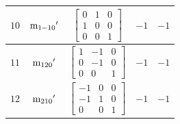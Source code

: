\documentclass[fleqn,8pt]{jsarticle}
\begin{document}
\begin{longtable}{ccccc}
$ 10 $ & $ {\rm m}_{1-10}{}' $ & $ \begin{bmatrix} 0 & 1 & 0 \\ 1 & 0 & 0 \\ 0 & 0 & 1 \end{bmatrix} $ & $ -1 $ & $ -1 $ \\ \hline
$ 11 $ & $ {\rm m}_{120}{}' $ & $ \begin{bmatrix} 1 & -1 & 0 \\ 0 & -1 & 0 \\ 0 & 0 & 1 \end{bmatrix} $ & $ -1 $ & $ -1 $ \\ \hline
$ 12 $ & $ {\rm m}_{210}{}' $ & $ \begin{bmatrix} -1 & 0 & 0 \\ -1 & 1 & 0 \\ 0 & 0 & 1 \end{bmatrix} $ & $ -1 $ & $ -1 $ \\
\end{longtable}
\end{document}
